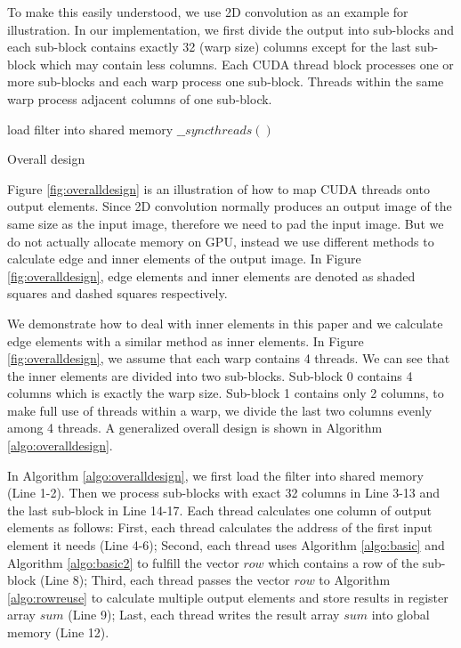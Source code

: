 To make this easily understood, we use 2D convolution as an example for illustration. In our implementation, we first divide the output
into sub-blocks and each sub-block contains exactly 32 (warp size) columns except for the last sub-block which may contain less columns.
Each CUDA thread block processes one or more sub-blocks and each warp process one sub-block. Threads within the same warp process adjacent
columns of one sub-block.
\begin{algorithm}
	load filter into shared memory\;
	$\_\_syncthreads()$\;
	\caption{Overall design}
	\label{algo:overalldesign}
\end{algorithm}

Figure \ref{fig:overalldesign} is an illustration of how to map CUDA threads onto output elements. Since 2D convolution normally produces
an output image of the same size as the input image, therefore we need to pad the input image. But we do not actually allocate memory on
GPU, instead we use different methods to calculate edge and inner elements of the output image. In Figure \ref{fig:overalldesign}, edge
elements and inner elements are denoted as shaded squares and dashed squares respectively.

We demonstrate how to deal with inner elements in this paper and we calculate edge elements with a similar method as inner elements. In
Figure \ref{fig:overalldesign}, we assume that each warp contains 4 threads. We can see that the inner elements are divided into two
sub-blocks. Sub-block 0 contains 4 columns which is exactly the warp size. Sub-block 1 contains only 2 columns, to make full use of threads
within a warp, we divide the last two columns evenly among 4 threads. A generalized overall design is shown in Algorithm
\ref{algo:overalldesign}.

In Algorithm \ref{algo:overalldesign}, we first load the filter into shared memory (Line 1-2). Then we process sub-blocks with exact 32
columns in Line 3-13 and the last sub-block in Line 14-17. Each thread calculates one column of output elements as follows: First, each
thread calculates the address of the first input element it needs (Line 4-6); Second, each thread uses Algorithm \ref{algo:basic} and
Algorithm \ref{algo:basic2} to fulfill the vector $row$ which contains a row of the sub-block (Line 8); Third, each thread passes the
vector $row$ to Algorithm \ref{algo:rowreuse} to calculate multiple output elements and store results in register array $sum$ (Line 9);
Last, each thread writes the result array $sum$ into global memory (Line 12).
